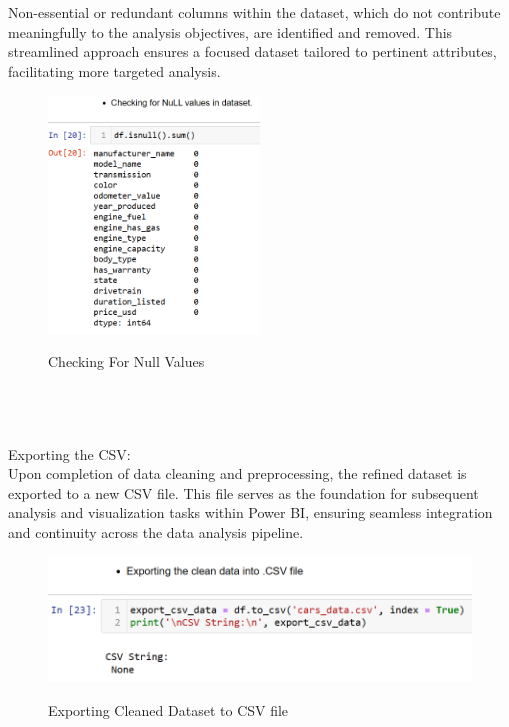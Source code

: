 \documentclass{article}
\begin{document}
{Non-essential or redundant columns within the dataset, which do not contribute meaningfully to the analysis objectives, are identified and removed. This streamlined approach ensures a focused dataset tailored to pertinent attributes, facilitating more targeted analysis.
\begin{figure}[htbp]
  \centering
  \vspace{0.3cm}
  \includegraphics[width=0.5\textwidth]{Figures/Python/checking for null values.png}\\
  \caption{Checking For Null Values}
  \vspace{0.3cm}
\end{figure}
\\
\\
\\
Exporting the CSV:
\\
Upon completion of data cleaning and preprocessing, the refined dataset is exported to a new CSV file. This file serves as the foundation for subsequent analysis and visualization tasks within Power BI, ensuring seamless integration and continuity across the data analysis pipeline.
\begin{figure}[htbp]
  \centering
  \vspace{0.3cm}
  \includegraphics[width=1\textwidth]{Figures/Python/Exporting csv.png}\\
  \caption{Exporting Cleaned Dataset to CSV file}
  \vspace{0.3cm}
\end{figure}
\\
\\
\newpage
}
\end{document}
